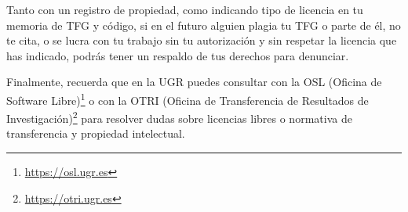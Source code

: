 Tanto con un registro de propiedad, como indicando tipo de licencia en tu memoria de TFG y código, si en el futuro alguien plagia tu TFG o parte de él, no te cita, o se lucra con tu trabajo sin tu autorización y sin respetar la licencia que has indicado, podrás tener un respaldo de tus derechos para denunciar.

Finalmente, recuerda que en la UGR puedes consultar con la OSL (Oficina de Software Libre)\footnote{\url{https://osl.ugr.es}} o con la OTRI (Oficina de Transferencia de Resultados de Investigación)\footnote{\url{https://otri.ugr.es}} para resolver dudas sobre licencias libres o normativa de transferencia y propiedad intelectual.

